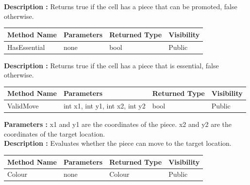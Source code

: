 \documentclass[12pt]{article}
\begin{document}
    \textbf{Description :} Returns true if the cell has a piece that can be promoted, false otherwise.

    \begin{table}[H]
        \begin{tabular}{|l|l|l|l|}
            \hline
            \rowcolor[HTML]{EFEFEF}
            \cellcolor[HTML]{EFEFEF}\textbf{Method Name} & \textbf{Parameters} & \textbf{Returned Type} & \textbf{Visibility} \\ \hline
            HasEssential                                 & none                & bool                   & Public              \\ \hline
        \end{tabular}
    \end{table}

    \textbf{Description :} Returns true if the cell has a piece that is essential, false otherwise.

    \begin{table}[H]
        \begin{tabular}{|l|l|l|l|}
            \hline
            \rowcolor[HTML]{EFEFEF}
            \cellcolor[HTML]{EFEFEF}\textbf{Method Name} & \textbf{Parameters}            & \textbf{Returned Type} & \textbf{Visibility} \\ \hline
            ValidMove                                    & int x1, int y1, int x2, int y2 & bool                   & Public              \\ \hline
        \end{tabular}
    \end{table}

    \textbf{Parameters :} x1 and y1 are the coordinates of the piece.
    x2 and y2 are the coordinates of the target location.
    \\

    \textbf{Description :} Evaluates whether the piece can move to the target location.

    \begin{table}[H]
        \begin{tabular}{|l|l|l|l|}
            \hline
            \rowcolor[HTML]{EFEFEF}
            \cellcolor[HTML]{EFEFEF}\textbf{Method Name} & \textbf{Parameters} & \textbf{Returned Type} & \textbf{Visibility} \\ \hline
            Colour                                       & none                & Colour                 & Public              \\ \hline
        \end{tabular}
    \end{table}
\end{document}
